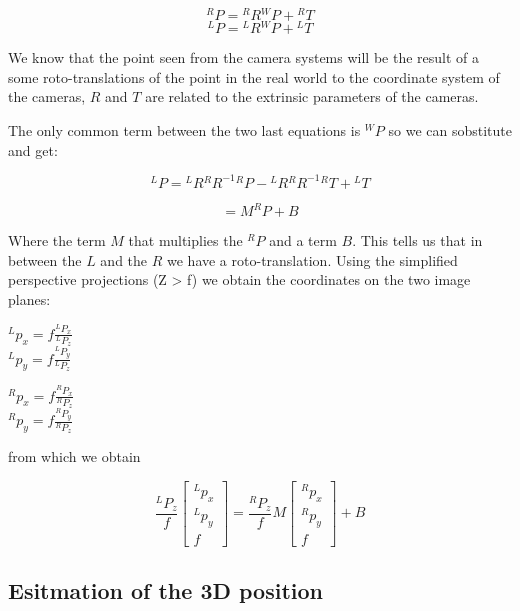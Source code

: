 \[
    {}^RP = {}^RR{}^WP+{}^RT
\]
\[
    {}^LP = {}^LR{}^WP+{}^LT  
\]

We know that the point seen from the camera systems will be the result of a some roto-translations of the point in the real world to the coordinate system of the cameras, \(R\) and \(T\) are related to the extrinsic parameters of the cameras.

The only common term between the two last equations is \({}^WP\) so we can sobstitute and get:

\[
    {}^LP = {}^LR{}^RR^{-1}{}^RP-{}^LR{}^RR^{-1}{}^RT+{}^LT
\]

\[
    = M^RP+B
\]

Where the term \(M\) that multiplies the \({}^RP\) and a term \(B\). This tells us that in between the \(L\) and the \(R\) we have a roto-translation. Using the simplified perspective projections (Z > f) we obtain the coordinates on the two image planes:

\begin{multicols}{2}

\(
    {}^Lp_x = f\frac{{}^LP_x}{{}^LP_z}  
\) \\
\(
    {}^Lp_y = f\frac{{}^LP_y}{{}^LP_z}
\)

\end{multicols}

\begin{multicols}{2}

\(
    {}^Rp_x = f\frac{{}^RP_x}{{}^RP_z}  
\) \\
\(
    {}^Rp_y = f\frac{{}^RP_y}{{}^RP_z}
\)
    
\end{multicols}

from which we obtain 

\[
    \frac{{}^LP_z}{f}
    \begin{bmatrix}
        {}^Lp_x \\
        {}^Lp_y \\
        f
    \end{bmatrix}
    =
    \frac{{}^RP_z}{f}
    M
    \begin{bmatrix}
        {}^Rp_x \\
        {}^Rp_y \\
        f 
    \end{bmatrix}
    + B
\]

\subsection{Esitmation of the 3D position}


